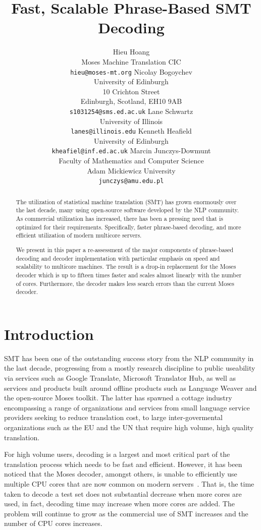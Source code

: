 \documentclass[11pt]{article}
\title{Fast, Scalable Phrase-Based SMT Decoding}
\author{Hieu Hoang\\
	    Moses Machine Translation CIC\\
	    {\tt hieu@moses-mt.org}
	  \And
	Nicolay Bogoychev\\
  	University of Edinburgh\\
  	10 Crichton Street\\
  	Edinburgh, Scotland, EH10 9AB\\
  {\tt s1031254@sms.ed.ac.uk}
	  \And
	Lane Schwartz\\
  	University of Illinois\\
  {\tt lanes@illinois.edu}
	  \AND
	Kenneth Heafield\\
  	University of Edinburgh\\
  {\tt kheafiel@inf.ed.ac.uk}
	  \And
	Marcin Junczys-Dowmunt\\
	Faculty of Mathematics and Computer Science \\
	Adam Mickiewicz University\\
  {\tt junczys@amu.edu.pl}
	}
\date{}
\begin{document}
\maketitle

\begin{abstract}
The utilization of statistical machine translation (SMT) has grown enormously over the last decade, many using open-source software developed by the NLP community. As commercial utilization has increased, there has been a pressing need that is optimized for their requirements. Specifically, faster phrase-based decoding, and more efficient utilization of modern multicore servers.

We present in this paper a re-assessment of the major components of phrase-based decoding and decoder implementation with particular emphasis on speed and scalability to multicore machines. The result is a drop-in replacement for the Moses decoder which is up to fifteen times faster and scales almost linearly with the number of cores. Furthermore, the decoder makes less search errors than the current Moses decoder.

\end{abstract}

\section{Introduction}

SMT has been one of the outstanding success story from the NLP community in the last decade, progressing from a mostly research discipline to public useability via services such as Google Translate, Microsoft Translator Hub, as well as services and products built around offline products such as Language Weaver and the open-source Moses toolkit. The latter has spawned a cottage industry  encompassing a range of organizations and services from small language service providers seeking to reduce translation cost, to large inter-govermental organizations such as the EU and the UN that require high volume, high quality translation.

For high volume users, decoding is a largest and most critical part of the translation process which needs to be fast and efficient. However, it has been noticed that the Moses decoder, amongst others, is unable to efficiently use multiple CPU cores that are now common on modern servers~\cite{mfernandez2016boosting}. That is, the time taken to decode a test set does not substantial decrease when more cores are used, in fact, decoding time may increase when more cores are added. The problem will continue to grow as the commercial use of SMT increases and the number of CPU cores increases.
\end{document}

